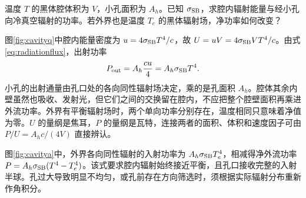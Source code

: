 \begin{example}[腔内能量与小孔辐射]\label{ex:cavity}
温度 $T$ 的黑体腔体积为 $V$，小孔面积为 $A_h$。已知 $\sigma_{\rm SB}$，求腔内辐射能量与经小孔向冷真空辐射的功率。若外界也是温度 $T_e$ 的黑体辐射场，净功率如何改变？
\end{example}
\begin{solution}
图\ref{fig:cavityq}中腔内能量密度为 $u=4\sigma_{\rm SB}T^4/c$，故 $U=uV=4\sigma_{\rm SB}VT^4/c$。由式\eqref{eq:radiationflux}，出射功率
\[
 P_{\rm out}=A_h\frac{cu}{4}=A_h\sigma_{\rm SB}T^4.
\]
小孔的出射通量由孔口处的各向同性辐射场决定，乘的是孔面积 $A_h$。腔体其余内壁虽然也吸收、发射光，但它们之间的交换留在腔内，不应把整个腔壁面积再乘进外流功率。外界有平衡辐射场时，两个单向功率分别存在，温度相同只意味着净值为零。$U$ 的量纲是焦耳，$P$ 的量纲是瓦特，连接两者的面积、体积和速度因子可由 $P/U=A_hc/(4V)$ 直接辨认。

图\ref{fig:cavitya}中，外界各向同性辐射的入射功率为 $A_h\sigma_{\rm SB}T_e^4$，相减得净外流功率 $P=A_h\sigma_{\rm SB}(T^4-T_e^4)$。该式要求腔内辐射始终接近平衡，且孔口接收完整的入射半球。孔过大导致明显不均匀，或孔前存在方向筛选时，须根据实际辐射分布重新作角积分。
\end{solution}

